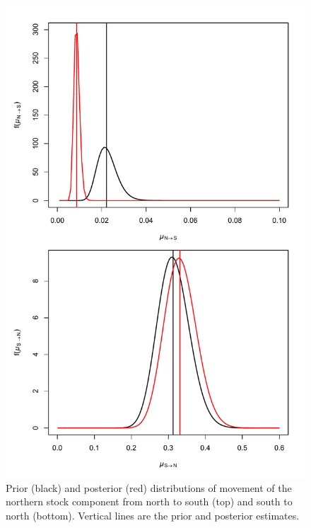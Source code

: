 \documentclass[
]{article}
\begin{document}
\begin{figure}

{\centering \includegraphics[width=1\linewidth]{move_prior_post} 

}

\caption{Prior (black) and posterior (red) distributions of movement of the northern stock component from north to south (top) and south to north (bottom). Vertical lines are the prior and posterior estimates.}\label{fig:move-prior-posterior}
\end{figure}
\pagebreak
\end{document}
